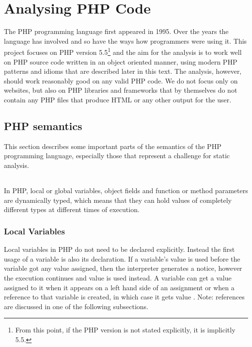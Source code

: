 
\chapter{Analysing PHP Code}

    The PHP programming language first appeared in 1995\cite{phphist}. Over the years 
    the language has involved and so have the ways how programmers were using it. 
    This project focuses on PHP version 5.5\footnote{From this point, 
    if the PHP version is not stated explicitly, it is implicitly 5.5.} 
    and the aim for the analysis 
    is to work well on PHP source code written in an object oriented manner, 
    using modern PHP patterns and idioms that are described later in 
    this text. The analysis, however, should work reasonably good on 
    any valid PHP code. We do not focus only on websites, but also on 
    PHP libraries and frameworks that by themselves do not contain 
    any PHP files that produce HTML or any other output for the user.
    
    \section{PHP semantics}
    This section describes some important parts of the semantics of 
    the PHP programming language, especially those that represent a 
    challenge for static analysis.
    
    \subparagraph*{}    
    In PHP, local or global variables, object fields and function or 
    method parameters are dynamically typed, which means that they 
    can hold values of completely different types at different 
    times of execution.
    
    \subsection{Local Variables}
    Local variables in PHP do not need to be declared explicitly. 
    Instead the first usage of a variable is also its declaration. 
    If a variable's value is used before the variable got any 
    value assigned, then the interpreter generates a notice, 
    however the execution continues and value  is 
    used instead. A variable can get a value assigned to it when it 
    appears on a left hand side of an assignment or when a 
    reference to that variable is created, in which case it gets value 
    . Note: references are discussed in one of the following 
    subsections.

